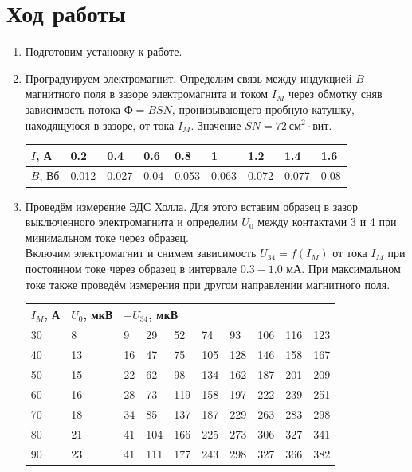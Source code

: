 \documentclass[a4paper,12pt]{article}
\begin{document}
\section*{Ход работы}
\begin{enumerate}
\item Подготовим установку к работе.
\item Проградуируем электромагнит. Определим связь между индукцией $B$ магнитного поля в зазоре электромагнита и током $I_M$ через обмотку сняв зависимость потока $\text{Ф} = BSN$, пронизывающего пробную катушку, находящуюся в зазоре, от тока $I_M$. Значение $SN = 72~\text{см}^2 \cdot \text{вит}$.
\begin{table}[h]
\centering
\begin{tabular}{|l|l|l|l|l|l|l|l|l|}
\hline
$I$, А  & 0.2   & 0.4   & 0.6  & 0.8   & 1     & 1.2   & 1.4   & 1.6  \\ \hline
$B$, Вб & 0.012 & 0.027 & 0.04 & 0.053 & 0.063 & 0.072 & 0.077 & 0.08 \\ \hline
\end{tabular}
\end{table}
\item Проведём измерение ЭДС Холла. Для этого вставим образец в зазор выключенного электромагнита и определим $U_0$ между контактами 3 и 4 при минимальном токе через образец.\\
Включим электромагнит и снимем зависимость $U_{34}=f\left(I_M\right)$ от тока $I_M$ при постоянном токе через образец в интервале $0.3-1.0$ мА. При максимальном токе также проведём измерения при другом направлении магнитного поля.
\begin{table}[h]
\centering
\begin{tabular}{|l||l||l|l|l|l|l|l|l|l|}
\hline
$I_M$, А & $U_0$, мкВ & \multicolumn{8}{l|}{$-U_{34}$, мкВ}  \\ \hline
30  & 8  & 9   & 29  & 52  & 74  & 93  & 106 & 116 & 123 \\ \hline
40  & 13 & 16  & 47  & 75  & 105 & 128 & 146 & 158 & 167 \\ \hline
50  & 15 & 22  & 62  & 98  & 134 & 162 & 187 & 201 & 209 \\ \hline
60  & 16 & 28  & 73  & 119 & 158 & 197 & 222 & 239 & 251 \\ \hline
70  & 18 & 34  & 85  & 137 & 187 & 229 & 263 & 283 & 298 \\ \hline
80  & 21 & 41  & 104 & 166 & 225 & 273 & 306 & 327 & 341 \\ \hline
90  & 23 & 41  & 111 & 177 & 243 & 298 & 327 & 366 & 382 \\ \hline

\end{tabular}
\end{table}
\end{enumerate}
\end{document}
